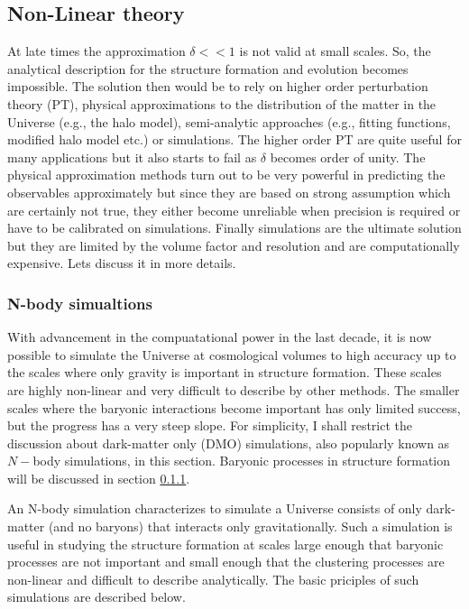 \subsection{Non-Linear theory}

At late times the approximation $\delta << 1$ is not valid at small scales. So, the analytical
description for the structure formation and evolution becomes impossible. The solution then would 
be to rely on higher order perturbation theory (PT), physical approximations to the
distribution of the matter in the Universe (e.g., the halo model), 
semi-analytic approaches (e.g., fitting functions, modified halo model etc.) or simulations. 
The higher order PT are quite useful for many applications but it also starts to 
fail as $\delta$ becomes order of unity. The physical approximation methods turn 
out to be very powerful in predicting the observables approximately 
but since they are based on strong assumption which are 
certainly not true, they either become unreliable when precision is required or have
to be calibrated on simulations. Finally simulations are the ultimate solution but they
are limited by the volume factor and resolution and are computationally expensive. 
Lets discuss it in more details. 

\subsubsection{N-body simualtions}

With advancement in the compuatational power in the last decade, it is now possible to
simulate the Universe at cosmological volumes to high accuracy up to the scales where
only gravity is important in structure formation. These scales are highly non-linear and
very difficult to describe by other methods. The smaller scales where the baryonic
interactions become important has only limited success, but the progress has a very
steep slope. For simplicity, I shall restrict the discussion about dark-matter only (DMO)
simulations, also popularly known as $N-$body simulations,
in this section. Baryonic processes in structure formation will be discussed in section \ref{}.

An N-body simulation
characterizes to simulate a Universe consists of only dark-matter (and no baryons) that 
interacts only gravitationally. Such a simulation is useful in studying the
structure formation at scales large enough that baryonic processes are not 
important and small enough that the clustering processes are non-linear and difficult
to describe analytically. The basic priciples of such simulations are described below.


